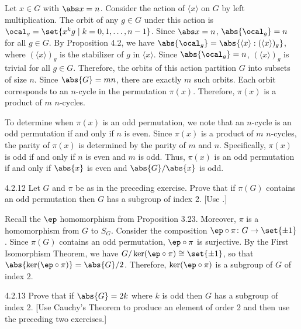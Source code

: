 \begin{sol}
	Let $x \in G$ with $\abs x = n$.
	Consider the action of $\langle x \rangle$ on $G$ by left multiplication.
	The orbit of any $g \in G$ under this action is $\ocal_g = \set{x^k g \mid k = 0, 1, \ldots, n-1}$.
	Since $\abs x = n$, $\abs{\ocal_g} = n$ for all $g \in G$.
	By Proposition 4.2, we have $\abs{\ocal_g} = \abs{\langle x \rangle : (\langle x \rangle)_g}$, where $(\langle x \rangle)_g$ is the stabilizer of $g$ in $\langle x \rangle$.
	Since $\abs{\ocal_g} = n$, $(\langle x \rangle)_g$ is trivial for all $g \in G$.
	Therefore, the orbits of this action partition $G$ into subsets of size $n$.
	Since $\abs{G} = mn$, there are exactly $m$ such orbits.
	Each orbit corresponds to an $n$-cycle in the permutation $\pi(x)$.
	Therefore, $\pi(x)$ is a product of $m$ $n$-cycles.

	To determine when $\pi(x)$ is an odd permutation, we note that an $n$-cycle is an odd permutation if and only if $n$ is even.
	Since $\pi(x)$ is a product of $m$ $n$-cycles, the parity of $\pi(x)$ is determined by the parity of $m$ and $n$.
	Specifically, $\pi(x)$ is odd if and only if $n$ is even and $m$ is odd.
	Thus, $\pi(x)$ is an odd permutation if and only if $\abs{x}$ is even and $\abs{G}/\abs{x}$ is odd.
\end{sol}

\begin{exercise}{4.2.12}
	Let $G$ and $\pi$ be as in the preceding exercise.
	Prove that if $\pi(G)$ contains an odd permutation then $G$ has a subgroup of index 2. [Use .]
\end{exercise}

\begin{sol}
	Recall the $\ep$ homomorphism from Proposition 3.23.
	Moreover, $\pi$ is a homomorphism from $G$ to $S_G$.
	Consider the composition $\ep \circ \pi \colon G \to \set{\pm 1}$.
	Since $\pi(G)$ contains an odd permutation, $\ep \circ \pi$ is surjective.
	By the First Isomorphism Theorem, we have $G/\ker(\ep \circ \pi) \cong \set{\pm 1}$, so that $\abs{\ker(\ep \circ \pi)} = \abs{G}/2$.
	Therefore, $\ker(\ep \circ \pi)$ is a subgroup of $G$ of index 2.
\end{sol}

\begin{exercise}{4.2.13}
	Prove that if $\abs{G} = 2k$ where $k$ is odd then $G$ has a subgroup of index 2. [Use Cauchy's Theorem to produce an element of order 2 and then use the preceding two exercises.]
\end{exercise}

